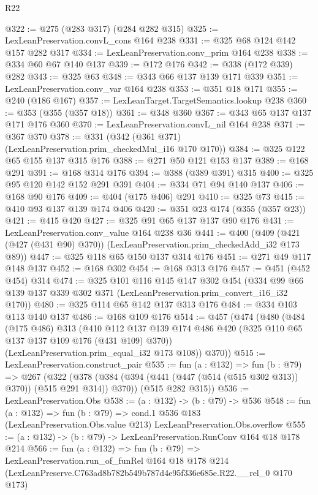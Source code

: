\begin{lexlean}{R22}
\begin{coremodule}
@322 := @275 (@283 @317) (@284 @282 @315)
@325 := LexLeanPreservation.convL_cons @164 @238
@331 := @325 @68 @124 @142 @157 @282 @317
@334 := LexLeanPreservation.conv_prim @164 @238
@338 := @334 @60 @67 @140 @137
@339 := @172 @176
@342 := @338 (@172 @339) @282
@343 := @325 @63
@348 := @343 @66 @137 @139 @171 @339
@351 := LexLeanPreservation.conv_var @164 @238
@353 := @351 @18 @171
@355 := @240 (@186 @167)
@357 := LexLeanTarget.TargetSemantics.lookup @238
@360 := @353 (@355 (@357 @18))
@361 := @348 @360
@367 := @343 @65 @137 @137 @171 @176 @360
@370 := LexLeanPreservation.convL_nil @164 @238
@371 := @367 @370
@378 := @331 (@342 (@361 @371) (LexLeanPreservation.prim_checkedMul_i16 @170 @170))
@384 := @325 @122 @65 @155 @137 @315 @176
@388 := @271 @50 @121 @153 @137
@389 := @168 @291
@391 := @168 @314 @176
@394 := @388 (@389 @391) @315
@400 := @325 @95 @120 @142 @152 @291 @391
@404 := @334 @71 @94 @140 @137
@406 := @168 @90 @176
@409 := @404 (@175 @406) @291
@410 := @325 @73
@415 := @410 @93 @137 @139 @174 @406
@420 := @351 @23 @174 (@355 (@357 @23))
@421 := @415 @420
@427 := @325 @91 @65 @137 @137 @90 @176
@431 := LexLeanPreservation.conv_value @164 @238 @36
@441 := @400 (@409 (@421 (@427 (@431 @90) @370)) (LexLeanPreservation.prim_checkedAdd_i32 @173 @89))
@447 := @325 @118 @65 @150 @137 @314 @176
@451 := @271 @49 @117 @148 @137
@452 := @168 @302
@454 := @168 @313 @176
@457 := @451 (@452 @454) @314
@474 := @325
    @101
    @116
    @145
    @147
    @302
    @454
    (@334 @99 @66 @139 @137 @339 @302 @371 (LexLeanPreservation.prim_convert_i16_i32 @170))
@480 := @325 @114 @65 @142 @137 @313 @176
@484 := @334 @103 @113 @140 @137
@486 := @168 @109 @176
@514 := @457
    (@474
      (@480
        (@484
          (@175 @486)
          @313
          (@410 @112 @137 @139 @174 @486 @420 (@325 @110 @65 @137 @137 @109 @176 (@431 @109) @370))
          (LexLeanPreservation.prim_equal_i32 @173 @108))
        @370))
@515 := LexLeanPreservation.construct_pair
@535 := fun (a : @132) =>
  fun (b : @79) =>
  @267
    (@322
      (@378 (@384 (@394 (@441 (@447 (@514 (@515 @302 @313)) @370)) (@515 @291 @314)) @370))
      (@515 @282 @315))
@536 := LexLeanPreservation.Obs
@538 := (a : @132) -> (b : @79) -> @536
@548 := fun (a : @132) =>
  fun (b : @79) =>
  cond.{1} @536 @183 (LexLeanPreservation.Obs.value @213) LexLeanPreservation.Obs.overflow
@555 := (a : @132) -> (b : @79) -> LexLeanPreservation.RunConv @164 @18 @178 @214
@566 := fun (a : @132) =>
  fun (b : @79) =>
  LexLeanPreservation.run_of_funRel
    @164
    @18
    @178
    @214
    (LexLeanPreserve.C763ad8b782b549b787d4e95f336e685e.R22.__rel_0 @170 @173)
\end{coremodule}
\end{lexlean}
